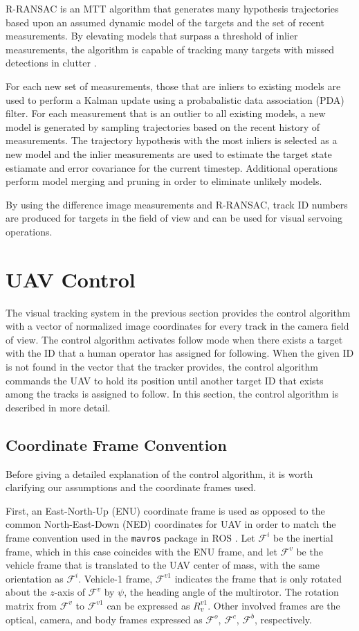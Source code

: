 R-RANSAC is an MTT algorithm that generates many hypothesis trajectories based upon an assumed dynamic model of the targets and the set of recent measurements. By elevating models that surpass a threshold of inlier measurements, the algorithm is capable of tracking many targets with missed detections in clutter \cite{Niedfeldt2014}.

For each new set of measurements, those that are inliers to existing models are used to perform a Kalman update using a probabalistic data association (PDA) filter. For each measurement that is an outlier to all existing models, a new model is generated by sampling trajectories based on the recent history of measurements. The trajectory hypothesis with the most inliers is selected as a new model and the inlier measurements are used to estimate the target state estiamate and error covariance for the current timestep. Additional operations perform model merging and pruning in order to eliminate unlikely models.

By using the difference image measurements and R-RANSAC, track ID numbers are produced for targets in the field of view and can be used for visual servoing operations.

\section{UAV Control}
The visual tracking system in the previous section provides the control algorithm with a vector of normalized image coordinates for every track in the camera field of view. The control algorithm activates follow mode when there exists a target with the ID that a human operator has assigned for following. When the given ID is not found in the vector that the tracker provides, the control algorithm commands the UAV to hold its position until another target ID that exists among the tracks is assigned to follow. In this section, the control algorithm is described in more detail.

\subsection{Coordinate Frame Convention}
Before giving a detailed explanation of the control algorithm, it is worth clarifying our assumptions and the coordinate frames used. 

First, an East-North-Up (ENU) coordinate frame is used as opposed to the common North-East-Down (NED) coordinates for UAV in order to match the frame convention used in the \texttt{mavros} package in ROS \cite{mavros}. Let $\mathcal{F}^i$ be the inertial frame, which in this case coincides with the ENU frame, and let $\mathcal{F}^v$ be the vehicle frame that is translated to the UAV center of mass, with the same orientation as $\mathcal{F}^i$. Vehicle-1 frame, $\mathcal{F}^{v1}$ indicates the frame that is only rotated about the $z$-axis of $\mathcal{F}^{v}$ by $\psi$, the heading angle of the multirotor. The rotation matrix from $\mathcal{F}^v$ to $\mathcal{F}^{v1}$ can be expressed as $R^{v1}_v$. Other involved frames are the optical, camera, and body frames expressed as $\mathcal{F}^o$, $\mathcal{F}^c$, $\mathcal{F}^b$, respectively. 

